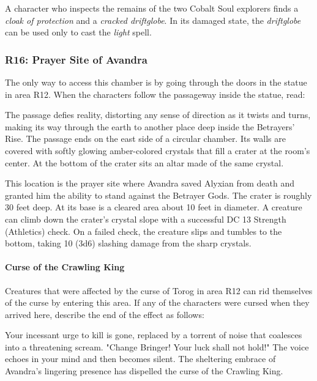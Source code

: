 \documentclass[letterpaper, 11pt, bg=full, twocolumn]{dndbook}
\begin{document}
A character who inspects the remains of the two Cobalt Soul explorers finds a \textit{cloak of protection} and a \textit{cracked driftglobe}. In its damaged state, the \textit{driftglobe} can be used only to cast the \textit{light} spell.

\subsubsection{R16: Prayer Site of Avandra}

The only way to access this chamber is by going through the doors in the statue in area R12. When the characters follow the passageway inside the statue, read:

\begin{DndReadAloud}
The passage defies reality, distorting any sense of direction as it twists and turns, making its way through the earth to another place deep inside the Betrayers' Rise. The passage ends on the east side of a circular chamber. Its walls are covered with softly glowing amber-colored crystals that fill a crater at the room's center. At the bottom of the crater sits an altar made of the same crystal.
\end{DndReadAloud}


This location is the prayer site where Avandra saved Alyxian from death and granted him the ability to stand against the Betrayer Gods. The crater is roughly 30 feet deep. At its base is a cleared area about 10 feet in diameter. A creature can climb down the crater's crystal slope with a successful DC 13 Strength (Athletics) check. On a failed check, the creature slips and tumbles to the bottom, taking 10 (3d6) slashing damage from the sharp crystals.

\paragraph{Curse of the Crawling King}

Creatures that were affected by the curse of Torog in area R12 can rid themselves of the curse by entering this area. If any of the characters were cursed when they arrived here, describe the end of the effect as follows:

\begin{DndReadAloud}
Your incessant urge to kill is gone, replaced by a torrent of noise that coalesces into a threatening scream.
"Change Bringer! Your luck shall not hold!"
The voice echoes in your mind and then becomes silent. The sheltering embrace of Avandra's lingering presence has dispelled the curse of the Crawling King.
\end{DndReadAloud}
\end{document}
